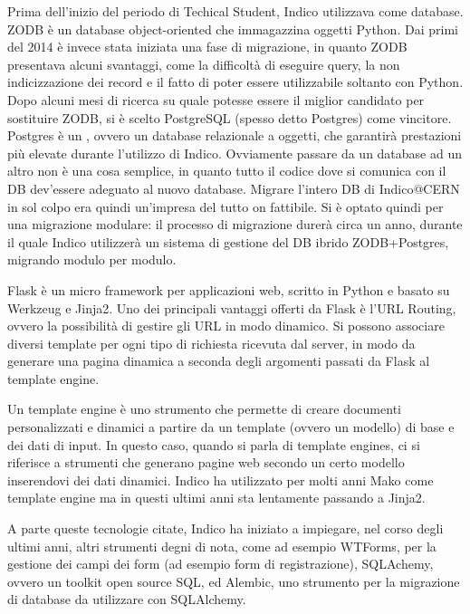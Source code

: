 		Prima dell'inizio del periodo di Techical Student, Indico utilizzava  come database. \ac{ZODB} è un database object-oriented che immagazzina oggetti Python. Dai primi del 2014 è invece stata iniziata una fase di migrazione, in  quanto \ac{ZODB} presentava alcuni svantaggi, come la difficoltà di eseguire query, la non indicizzazione dei record e il fatto di poter essere utilizzabile soltanto con Python. Dopo alcuni mesi di ricerca su quale potesse essere il miglior candidato per sostituire \ac{ZODB}, si è scelto PostgreSQL (spesso detto Postgres) come vincitore. Postgres è un , ovvero un database relazionale a oggetti, che garantirà prestazioni più elevate durante l'utilizzo di Indico. Ovviamente passare da un database ad un altro non è una cosa semplice, in quanto tutto il codice dove si comunica con il \ac{DB} dev'essere adeguato al nuovo database. Migrare l'intero \ac{DB} di Indico@CERN in sol colpo era quindi un'impresa del tutto on fattibile. Si è optato quindi per una migrazione modulare: il processo di migrazione durerà circa un anno, durante il quale Indico utilizzerà un sistema di gestione del \ac{DB} ibrido \ac{ZODB}+Postgres, migrando modulo per modulo. \cite{indico:zodb}\cite{pedro:chep}
		
		Flask è un micro framework per applicazioni web, scritto in Python e basato su Werkzeug e Jinja2. Uno dei principali vantaggi offerti da Flask è l'URL Routing, ovvero la  possibilità di gestire gli URL in modo dinamico. Si possono associare diversi template per ogni tipo di richiesta ricevuta dal server, in modo da generare una pagina dinamica a seconda degli argomenti passati da Flask al template engine. \cite{indico:flask}
		
		Un template engine è uno strumento che permette di creare documenti personalizzati e dinamici a partire da un template (ovvero un modello) di base e dei dati di input. In questo caso, quando si parla di template engines, ci si riferisce a strumenti che generano pagine web secondo un certo modello inserendovi dei dati dinamici. Indico ha utilizzato per molti anni Mako come template engine ma in questi ultimi anni sta lentamente passando a Jinja2. \cite{indico:template_engines}
		
		A parte queste tecnologie citate, Indico ha iniziato a impiegare, nel corso degli ultimi anni, altri strumenti degni di nota, come  ad esempio WTForms, per la gestione dei campi dei form (ad esempio form di registrazione), SQLAchemy, ovvero un toolkit open source SQL, ed Alembic, uno strumento per la migrazione di database da utilizzare con SQLAlchemy.
		
